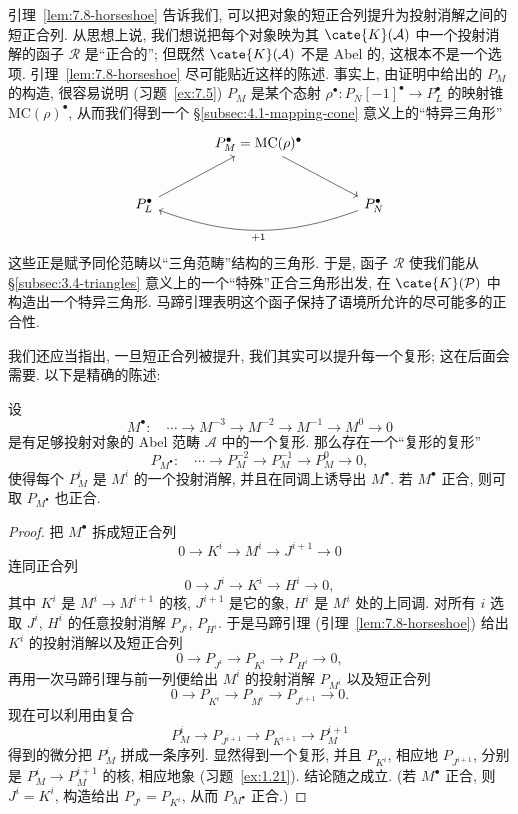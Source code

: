 引理~\ref{lem:7.8-horseshoe} 告诉我们, 可以把对象的短正合列提升为投射消解之间的短正合列. 从思想上说, 我们想说把每个对象映为其 $\cate{K}(\mathcal{A})$ 中一个投射消解的函子 $\mathcal{R}$ 是``正合的''; 但既然 $\cate{K}(\mathcal{A})$ 不是 Abel 的, 这根本不是一个选项. 引理~\ref{lem:7.8-horseshoe} 尽可能贴近这样的陈述. 事实上, 由证明中给出的 $P_M$ 的构造, 很容易说明 (习题~\ref{ex:7.5}) $P_M$ 是某个态射 $\rho^\bullet:P_N[-1]^\bullet\to P_L^\bullet$ 的映射锥 $\mathrm{MC}(\rho)^\bullet$, 从而我们得到一个 \S\ref{subsec:4.1-mapping-cone} 意义上的``特异三角形''
\[
\begin{tikzcd}[ampersand replacement=\&,column sep=large,row sep=large]
\&P_M^\bullet=\mathrm{MC}(\rho)^\bullet\ar[dr]\&\\
P_L^\bullet\ar[ur]\&\&P_N^\bullet\ar[ll,bend left=20,"{+1}"]
\end{tikzcd}
\]
这些正是赋予同伦范畴以``三角范畴''结构的三角形. 于是, 函子 $\mathcal{R}$ 使我们能从 \S\ref{subsec:3.4-triangles} 意义上的一个``特殊''正合三角形出发, 在 $\cate{K}(\mathcal{P})$ 中构造出一个特异三角形. 马蹄引理表明这个函子保持了语境所允许的尽可能多的正合性.

我们还应当指出, 一旦短正合列被提升, 我们其实可以提升每一个复形; 这在后面会需要. 以下是精确的陈述:

\begin{corollary}\label{cor:7.9-lift-complex}
设
\[
M^\bullet:\quad \cdots\to M^{-3}\to M^{-2}\to M^{-1}\to M^0\to 0
\]
是有足够投射对象的 Abel 范畴 $\mathcal{A}$ 中的一个复形. 那么存在一个``复形的复形''
\[
P_{M^\bullet}:\quad \cdots\to P_{M}^{-2}\to P_{M}^{-1}\to P_{M}^{0}\to 0,
\]
使得每个 $P_{M}^i$ 是 $M^i$ 的一个投射消解, 并且在同调上诱导出 $M^\bullet$. 若 $M^\bullet$ 正合, 则可取 $P_{M^\bullet}$ 也正合.
\end{corollary}

\begin{proof}
把 $M^\bullet$ 拆成短正合列
\[
0\to K^i\to M^i\to J^{i+1}\to 0
\]
连同正合列
\[
0\to J^i\to K^i\to H^i\to 0,
\]
其中 $K^i$ 是 $M^i\to M^{i+1}$ 的核, $J^{i+1}$ 是它的象, $H^i$ 是 $M^i$ 处的上同调. 对所有 $i$ 选取 $J^i$, $H^i$ 的任意投射消解 $P_{J^i}$, $P_{H^i}$. 于是马蹄引理 (引理~\ref{lem:7.8-horseshoe}) 给出 $K^i$ 的投射消解以及短正合列
\[
0\to P_{J^i}\to P_{K^i}\to P_{H^i}\to 0,
\]
再用一次马蹄引理与前一列便给出 $M^i$ 的投射消解 $P_{M^i}$ 以及短正合列
\[
0\to P_{K^i}\to P_{M^i}\to P_{J^{i+1}}\to 0.
\]
现在可以利用由复合
\[
P_{M}^i\to P_{J^{i+1}}\to P_{K^{i+1}}\to P_{M}^{i+1}
\]
得到的微分把 $P_{M}^i$ 拼成一条序列. 显然得到一个复形, 并且 $P_{K^i}$, 相应地 $P_{J^{i+1}}$, 分别是 $P_{M}^i\to P_{M}^{i+1}$ 的核, 相应地象 (习题~\ref{ex:1.21}). 结论随之成立. (若 $M^\bullet$ 正合, 则 $J^i=K^i$, 构造给出 $P_{J^i}=P_{K^i}$, 从而 $P_{M^\bullet}$ 正合.)
\end{proof}

